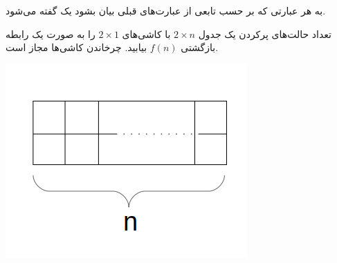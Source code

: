 \begin{DEFINITION}
    \p
    به هر عبارتی که بر حسب تابعی از عبارت‌های قبلی بیان بشود یک
     گفته می‌شود.
\end{DEFINITION}

\begin{PROBLEM}
    \p
    تعداد حالت‌های پرکردن یک جدول 
    $2\times n$
    با کاشی‌های
    $2\times 1$
    را به صورت یک رابطه بازگشتی 
    $f(n)$
    بیابید.
    چرخاندن کاشی‌ها مجاز است.
    \begin{center}
        \includegraphics[totalheight=4cm]{im1.png}
        \end{center}
\end{PROBLEM}
